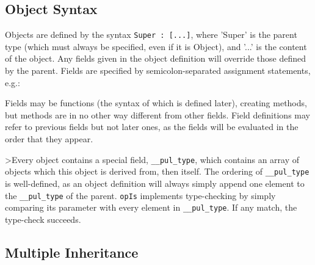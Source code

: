 \begin{comment}
<p class="P5"><span class="T10">opEqual</span> and <span class="T10">opNotEqual</span> check object identity in Object, but should be overloaded in any code with a well-defined equality operation. <span class="T10">opIs</span> implements type-checking, which will be described further in the next section.
\end{comment}



\subsection{Object Syntax}

Objects are defined by the syntax \texttt{Super : [...]}, where 'Super' is the parent type (which must always be specified, even if it is Object), and '...' is the content of the object. Any fields given in the object definition will override those defined by the parent. Fields are specified by semicolon-separated assignment statements, e.g.:

\begin{comment}
<p class="P20">var O = Object : [

<p class="P20"><span style="margin-left:;"/>x = 3;

<p class="P20"><span style="margin-left:;"/>y = 4;

<p class="P20">];
\end{comment}



Fields may be functions (the syntax of which is defined later), creating methods, but methods are in no other way different from other fields. Field definitions may refer to previous fields but not later ones, as the fields will be evaluated in the order that they appear.

>Every object contains a special field, \texttt{\_\_pul\_type}, which contains an array of objects which this object is derived from, then itself. The ordering of \texttt{\_\_pul\_type} is well-defined, as an object definition will always simply append one element to the \texttt{\_\_pul\_type} of the parent. \texttt{opIs} implements type-checking by simply comparing its parameter with every element in \texttt{\_\_pul\_type}. If any match, the type-check succeeds.



\subsection{Multiple Inheritance}

